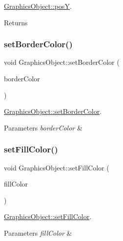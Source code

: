 \hyperlink{class_graphics_object_adfd441f0d80339456482cc71355ba429}{Graphics\+Object\+::posY}. 

\begin{DoxyReturn}{Returns}

\end{DoxyReturn}
\mbox{\label{class_graphics_object_a23b8350a123074dfcd5b3807bda06487}} 
\subsubsection{\texorpdfstring{set\+Border\+Color()}{setBorderColor()}}
{\footnotesize\ttfamily void Graphics\+Object\+::set\+Border\+Color (\begin{DoxyParamCaption}\item[{const Q\+Color \&}]{border\+Color }\end{DoxyParamCaption})}



\hyperlink{class_graphics_object_a23b8350a123074dfcd5b3807bda06487}{Graphics\+Object\+::set\+Border\+Color}. 


\begin{DoxyParams}{Parameters}
{\em border\+Color} & \\
\hline
\end{DoxyParams}
\mbox{\label{class_graphics_object_a125ba24bcb7f858a20054a9c57ae8a97}} 
\subsubsection{\texorpdfstring{set\+Fill\+Color()}{setFillColor()}}
{\footnotesize\ttfamily void Graphics\+Object\+::set\+Fill\+Color (\begin{DoxyParamCaption}\item[{const Q\+Color \&}]{fill\+Color }\end{DoxyParamCaption})}



\hyperlink{class_graphics_object_a125ba24bcb7f858a20054a9c57ae8a97}{Graphics\+Object\+::set\+Fill\+Color}. 


\begin{DoxyParams}{Parameters}
{\em fill\+Color} & \\
\hline
\end{DoxyParams}
\mbox{\label{class_graphics_object_a1b0c7c7f87e86833a9a23ab1a2b6f685}} 
